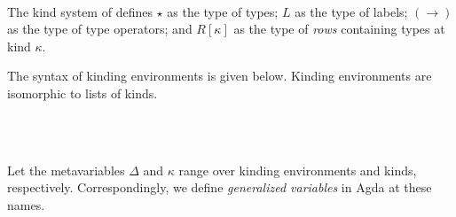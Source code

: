 \documentclass[authoryear, acmsmall, screen, review, nonacm]{acmart}
\begin{document}
\begin{code}%
\>[0]\AgdaSpace{}%
\AgdaSpace{}%
\AgdaSymbol{:}\AgdaSpace{}%
\AgdaSpace{}%
\<%
\\
\>[0][@{}l@{\AgdaIndent{0}}]%
\>[2]%
\>[8]\AgdaSymbol{:}\AgdaSpace{}%
\<%
\\
%
\>[2]%
\>[8]\AgdaSymbol{:}\AgdaSpace{}%
\<%
\\
%
\>[2]\AgdaSpace{}%
\AgdaSymbol{:}\AgdaSpace{}%
\AgdaSpace{}%
\AgdaSpace{}%
\AgdaSpace{}%
\AgdaSpace{}%
\<%
\\
%
\>[2]%
\>[8]\AgdaSymbol{:}\AgdaSpace{}%
\AgdaSpace{}%
\AgdaSpace{}%
\<%
\\
%
\\[\AgdaEmptyExtraSkip]%
\>[0]\AgdaSpace{}%
\AgdaSpace{}%
\<%
\end{code}

The kind system of \Rome defines $\star$ as the type of types; $L$ as the type of labels; $(\to)$ as the type of type operators; and $R[\kappa]$ as the type of \emph{rows} containing types at kind $\kappa$.

The syntax of kinding environments is given below. Kinding environments are isomorphic to lists of kinds.

\begin{code}%
\>[0]\AgdaSpace{}%
\AgdaSpace{}%
\AgdaSymbol{:}\AgdaSpace{}%
\AgdaSpace{}%
\<%
\\
\>[0][@{}l@{\AgdaIndent{0}}]%
\>[2]\AgdaSpace{}%
\AgdaSymbol{:}\AgdaSpace{}%
\<%
\\
%
\>[2]\AgdaOperator{\AgdaInductiveConstructor{\AgdaUnderscore{},,\AgdaUnderscore{}}}\AgdaSpace{}%
\AgdaSymbol{:}\AgdaSpace{}%
\AgdaSpace{}%
\AgdaSpace{}%
\AgdaSpace{}%
\AgdaSpace{}%
\<%
\end{code}

Let the metavariables $\Delta$ and $\kappa$ range over kinding environments and kinds, respectively. Correspondingly, we define \emph{generalized variables} in Agda at these names. 
\end{document}
